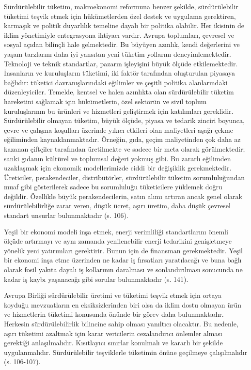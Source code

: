 \documentclass[
]{book}
\begin{document}
Sürdürülebilir tüketim, makroekonomi reformuna benzer şekilde, sürdürülebilir tüketimi teşvik etmek için hükümetlerden özel destek ve uygulama gerektiren, karmaşık ve politik duyarlılık temeline dayalı bir politika olabilir. Her ikisinin de iklim yönetimiyle entegrasyona ihtiyacı vardır. Avrupa toplumları, çevresel ve sosyal açıdan bilinçli hale gelmektedir. Bu büyüyen azınlık, kendi değerlerini ve yaşam tarzlarını daha iyi yansıtan yeni tüketim yollarını deneyimlemektedir. Teknoloji ve teknik standartlar, pazarın işleyişini büyük ölçüde etkilemektedir. İnsanların ve kuruluşların tüketimi, iki faktör tarafından oluşturulan piyasaya bağlıdır: tüketici davranışlarındaki eğilimler ve çeşitli politika alanlarındaki düzenleyiciler. Temelde, kentsel ve halen azınlıkta olan sürdürülebilir tüketim hareketini sağlamak için hükümetlerin, özel sektörün ve sivil toplum kuruluşlarının bu ürünleri ve hizmetleri geliştirmek için katılımları gereklidir. Sürdürülebilir olmayan tüketim, büyük ölçüde, piyasa ve tedarik zinciri boyunca, çevre ve çalışma koşulları üzerinde yıkıcı etkileri olan maliyetleri aşağı çekme eğiliminden kaynaklanmaktadır. Örneğin, gıda, geçim maliyetinden çok daha az kazanan çiftçiler tarafından üretilmekte ve sadece bir meta olarak görülmektedir; sanki gıdanın kültürel ve toplumsal değeri yokmuş gibi. Bu zararlı eğilimden uzaklaşmak için ekonomik modellerimizde ciddi bir değişiklik gerekmektedir. Üreticiler, perakendeciler, distribütörler, sürdürülebilir tüketim sorumluluğundan muaf gibi gösterilerek sadece bu sorumluluğu tüketicilere yüklemek doğru değildir. Özellikle büyük perakendecilerin, satın alımı artıran ancak genel olarak sürdürülebilirliğe zarar veren, düşük ücret, aşırı üretim, daha düşük çevresel standart unsurlar bulunmaktadır (s. 106). \citep{ponthieu2019climate}

Yeşil bir ekonomi modeli inşa etmek, enerji verimliliği standartlarını önemli ölçüde artırmayı ve aynı zamanda yenilenebilir enerji tedarikini genişletmeye yönelik yeni yatırımları gerektirir. Bunun için de finansman gerekmektedir. Yeşil bir ekonomi inşa etme üzerinden ne kadar iş fırsatları yaratılacağı ve buna bağlı olarak fosil yakıta dayalı iş kollarının daralması ve sonlandırılması sonucunda ne kadar iş kaybı yaşanacağı gibi sorular bulunmaktadır (s. 141). \citep{chomsky2020}

Avrupa Birliği sürdürülebilir üretimi ve tüketimi teşvik etmek için ortaya koyduğu mevzuatların en eksiksizlerinden biri olsa da iklim dostu olmayan ürün ve hizmetlerin tüketimi konusunda önünde bir görev daha bulunmaktadır. Herkesin sürdürülebilirlik bilincine sahip olması yanıltıcı olacaktır. Bu nedenle, aşırı tüketimi azaltmak için karar vericilerin cezalandırıcı önlemler alması gerektiği anlaşılmalıdır. Kısıtlayıcı sınırlar konulmalı ve kararlı bir şekilde uygulanmalıdır. Sürdürülebilir teşviklerle tüketimin önüne geçilmeye çalışılmalıdır (s. 106-107). \citep{ponthieu2019climate}
\end{document}
